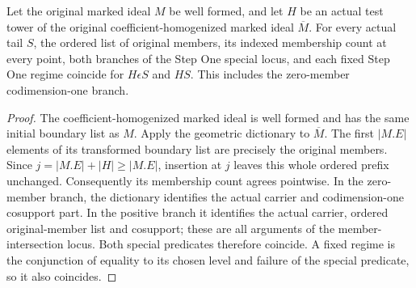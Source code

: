 \begin{lemma}
\label{hir:original-interior-empty-step-one-dictionary}
\leanok
{}
Let the original marked ideal $M$ be well formed, and let $H$ be an actual test
tower of the original coefficient-homogenized marked ideal $\overline M$.
For every actual tail $S$, the ordered list of original members, its indexed
membership count at every point, both branches of the Step One special locus,
and each fixed Step One regime coincide for $H\epsilon S$ and $HS$.
This includes the zero-member codimension-one branch.
\end{lemma}
\begin{proof}
The coefficient-homogenized marked ideal is well formed and has the same
initial boundary list as $M$.  Apply the geometric dictionary to $\overline M$.
The first $|M.E|$ elements of its transformed boundary list are precisely the
original members.  Since $j=|M.E|+|H|\geq |M.E|$, insertion at $j$ leaves this
whole ordered prefix unchanged.  Consequently its membership count agrees
pointwise.  In the zero-member branch, the dictionary identifies the actual
carrier and codimension-one cosupport part.  In the positive branch it
identifies the actual carrier, ordered original-member list and cosupport;
these are all arguments of the member-intersection locus.  Both special
predicates therefore coincide.  A fixed regime is the conjunction of equality
to its chosen level and failure of the special predicate, so it also coincides.
\end{proof}


